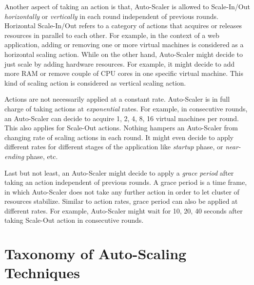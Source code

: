 Another aspect of taking an action is that, Auto-Scaler is allowed to Scale-In/Out \emph{horizontally} or \emph{vertically} in each round independent of previous rounds. Horizontal Scale-In/Out refers to a category of actions that acquires or releases resources in parallel to each other. For example, in the context of a web application, adding or removing one or more virtual machines is considered as a horizontal scaling action. While on the other hand, Auto-Scaler might decide to just scale by adding hardware resources. For example, it might decide to add more RAM or remove couple of CPU cores in one specific virtual machine. This kind of scaling action is considered as vertical scaling action.

Actions are not necessarily applied at a constant rate. Auto-Scaler is in full charge of taking actions at \emph{exponential} rates. For example, in consecutive rounds, an Auto-Scaler can decide to acquire 1, 2, 4, 8, 16 virtual machines per round. This also applies for Scale-Out actions. Nothing hampers an Auto-Scaler from changing rate of scaling actions in each round. It might even decide to apply different rates for different stages of the application like \emph{startup} phase, or \emph{near-ending} phase, etc.

Last but not least, an Auto-Scaler might decide to apply a \emph{grace period} after taking an action independent of previous rounds. A grace period is a time frame, in which Auto-Scaler does not take any further action in order to let cluster of resources stabilize. Similar to action rates, grace period can also be applied at different rates. For example, Auto-Scaler might wait for 10, 20, 40 seconds after taking Scale-Out action in consecutive rounds.

\section{Taxonomy of Auto-Scaling Techniques}
\label{ias:taxonomy}

